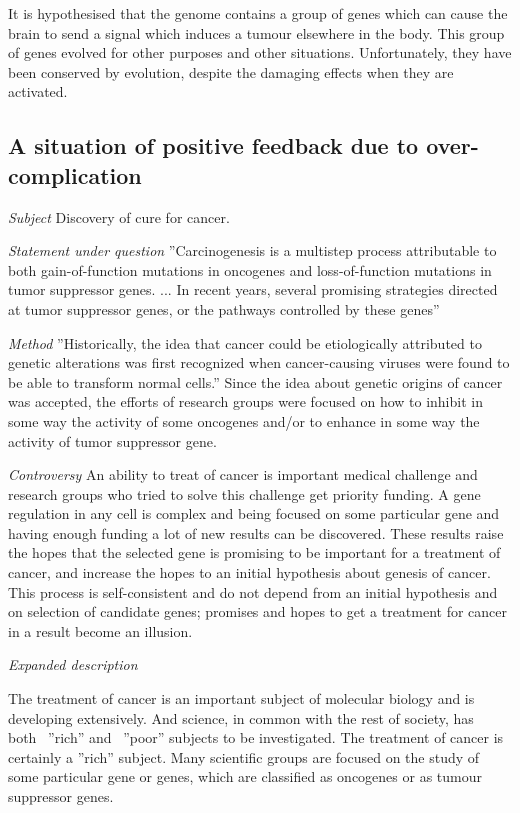 \documentclass[12pt,aps]{revtex4}
\begin{document}
It is hypothesised that the genome contains a group of genes which can cause the brain to send a signal which induces a tumour elsewhere in the body. This group of genes evolved for other purposes and other situations. Unfortunately, they have been conserved by evolution, despite the damaging effects when they are activated. 

\subsection{A situation of positive feedback due to over-complication}

\emph{Subject} Discovery of cure for cancer.

\emph{Statement under question} ''Carcinogenesis is a multistep process attributable to both gain-of-function mutations in oncogenes and loss-of-function mutations in tumor suppressor genes. ... In recent years, several promising strategies directed at tumor suppressor genes, or the pathways controlled by these genes'' \cite{CO1}

\emph{Method} ''Historically, the idea that cancer could be etiologically attributed to genetic alterations was first recognized when cancer-causing viruses were found to be able to transform normal cells.'' \cite{CO1} Since the idea about genetic origins of cancer was accepted, the efforts of research groups were focused on how to inhibit in some way the activity of some oncogenes and/or to enhance in some way the activity of tumor suppressor gene.

\emph{Controversy} An ability to treat of cancer is important medical challenge and research groups who tried to solve this challenge get priority funding. A gene regulation in any cell is complex and being focused on some particular gene and having enough funding a lot of new results can be discovered. These results raise the hopes that the selected gene is promising to be important for a treatment of cancer, and increase the hopes to an initial hypothesis about genesis of cancer. This process is self-consistent and do not depend from an initial hypothesis and on selection of candidate genes; promises and hopes to get a treatment for cancer in a result become an illusion. 

\emph{Expanded description}

The treatment of cancer is an important subject of molecular biology and is developing extensively. And science, in common with the rest of society, has both  ''rich'' and  ''poor'' subjects to be investigated. The treatment of cancer is certainly a ''rich'' subject. Many scientific groups are focused on the study of some particular gene or genes, which are classified as oncogenes or as tumour suppressor genes.  
\end{document}
